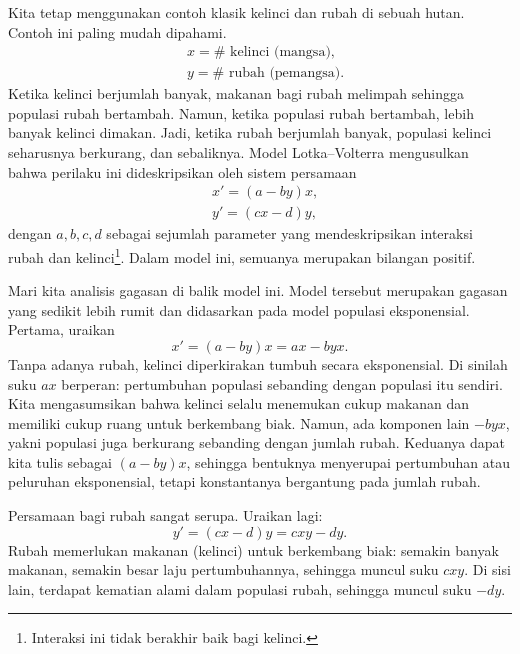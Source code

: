 Kita tetap menggunakan contoh klasik kelinci dan rubah di sebuah hutan.
Contoh ini paling mudah dipahami.
\begin{equation*}
\begin{aligned}
& x = \# \text{ kelinci (mangsa),} \\
& y = \# \text{ rubah (pemangsa).}
\end{aligned}
\end{equation*}
Ketika kelinci berjumlah banyak, makanan bagi rubah melimpah sehingga
populasi rubah bertambah. Namun, ketika populasi rubah bertambah, lebih banyak
kelinci dimakan. Jadi, ketika rubah berjumlah banyak, populasi kelinci
seharusnya berkurang, dan sebaliknya.
Model Lotka--Volterra mengusulkan bahwa perilaku ini dideskripsikan oleh
sistem persamaan
\begin{equation*}
\begin{aligned}
& x' = (a-by)x, \\
& y' = (cx-d)y,
\end{aligned}
\end{equation*}
dengan $a,b,c,d$ sebagai sejumlah parameter yang mendeskripsikan interaksi
rubah dan kelinci\footnote{Interaksi ini tidak berakhir baik bagi kelinci.}.
Dalam model ini, semuanya merupakan bilangan positif.

Mari kita analisis gagasan di balik model ini. Model tersebut merupakan
gagasan yang sedikit lebih rumit dan didasarkan pada model populasi
eksponensial. Pertama, uraikan
\begin{equation*}
x' = (a-by)x = ax - byx .
\end{equation*}
Tanpa adanya rubah, kelinci diperkirakan tumbuh secara eksponensial.
Di sinilah suku $ax$ berperan: pertumbuhan populasi sebanding dengan populasi
itu sendiri. Kita mengasumsikan bahwa kelinci selalu menemukan cukup makanan
dan memiliki cukup ruang untuk berkembang biak. Namun, ada komponen lain
$-byx$, yakni populasi juga berkurang sebanding dengan jumlah rubah.
Keduanya dapat kita tulis sebagai $(a-by)x$, sehingga bentuknya menyerupai
pertumbuhan atau peluruhan eksponensial, tetapi konstantanya bergantung pada
jumlah rubah.

Persamaan bagi rubah sangat serupa. Uraikan lagi:
\begin{equation*}
y' = (cx-d)y = cxy-dy .
\end{equation*}
Rubah memerlukan makanan (kelinci) untuk berkembang biak: semakin banyak
makanan, semakin besar laju pertumbuhannya, sehingga muncul suku $cxy$.
Di sisi lain, terdapat kematian alami dalam populasi rubah, sehingga muncul
suku $-dy$.

